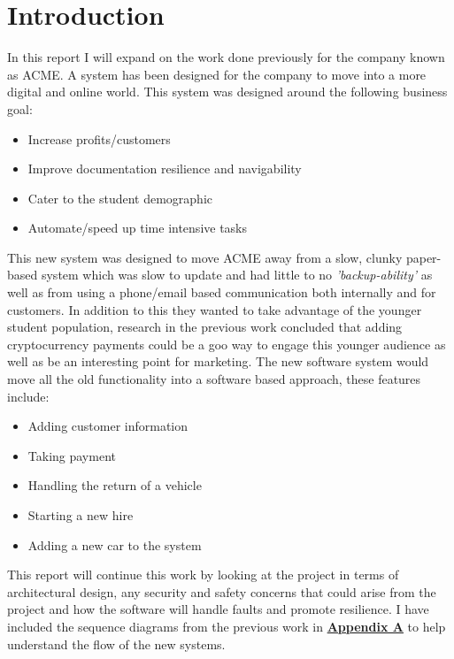 \section{Introduction}

  In this report I will expand on the work done previously for the company known as ACME. A system has been designed for the company to 
  move into a more digital and online world. This system was designed around the following business goal:
  \begin{itemize}
    \item Increase profits/customers
    \item Improve documentation resilience and navigability
    \item Cater to the student demographic
    \item Automate/speed up time intensive tasks
  \end{itemize}

  This new system was designed to move ACME away from a slow, clunky paper-based system which was slow to update and had little to no \textit{'backup-ability'}
  as well as from using a phone/email based communication both internally and for customers. In addition to this they wanted to take advantage of the younger  
  student population, research in the previous work concluded that adding cryptocurrency payments could be a goo way to engage this younger audience as well as
  be an interesting point for marketing. The new software system would move all the old functionality into a software based approach, these features include:

  \begin{itemize}
    \item Adding customer information
    \item Taking payment
    \item Handling the return of a vehicle
    \item Starting a new hire
    \item Adding a new car to the system
  \end{itemize}

  This report will continue this work by looking at the project in terms of architectural design, any security and safety concerns that could arise from the 
  project and how the software will handle faults and promote resilience. I have included the sequence diagrams from the previous work in 
  \hyperref[sec:AppendixA]{\textbf{Appendix A}} to help understand the flow of the new systems.

\newpage